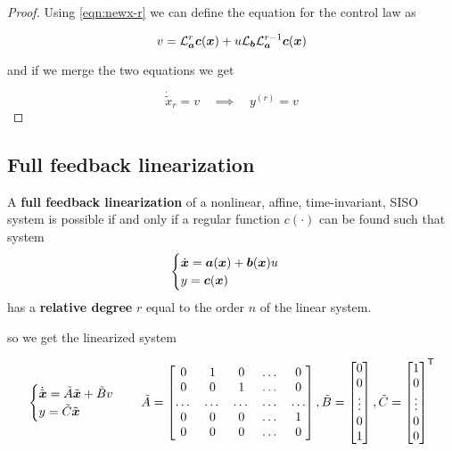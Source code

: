 \begin{proof}
    Using \cref{eqn:newx-r} we can define the equation for the control law as

    \[
        v = \mathcal{L}_{\boldsymbol{a}}^{r} \boldsymbol{c}(\boldsymbol{x}) + u \mathcal{L}_{\boldsymbol{b}} \mathcal{L}_{\boldsymbol{a}}^{r-1} \boldsymbol{c}(\boldsymbol{x})
    \]

    and if we merge the two equations we get

    \[
        \dot{\tilde x}_r = v \quad \implies \quad y^{(r)} = v
    \]
\end{proof}

\subsection{Full feedback linearization}

\begin{theorem}\label{thm:full-feedback-linearization}
A \textbf{full feedback linearization} of a nonlinear, affine, time-invariant, SISO system is possible if and only if a regular function $c(\cdot)$ can be found such that system
\[
    \begin{cases}
        \dot{\boldsymbol{x}} = \boldsymbol{a}(\boldsymbol{x}) + \boldsymbol{b}(\boldsymbol{x}) u \\
        y = \boldsymbol{c}(\boldsymbol{x})
    \end{cases}
\]
has a \textbf{relative degree} $r$ equal to the order $n$ of the linear system.
\end{theorem}

so we get the linearized system

\[
    \begin{cases}
        \dot{\tilde{\boldsymbol{x}}} = \tilde A \tilde{\boldsymbol{x}} + \tilde B v \\
        y = \tilde C \tilde{\boldsymbol{x}}
    \end{cases} \quad
    \tilde A = \begin{bmatrix}
            0 & 1 & 0 & \dots & 0 \\
            0 & 0 & 1 & \dots & 0 \\
            \dots & \dots & \dots & \dots & \dots \\
            0 & 0 & 0 & \dots & 1 \\
            0 & 0 & 0 & \dots & 0 \\
    \end{bmatrix},
    \tilde B = \begin{bmatrix}
                   0 \\ 0 \\ \vdots \\ 0 \\ 1
    \end{bmatrix},
    \tilde C = \begin{bmatrix}
                   1 \\ 0 \\ \vdots \\ 0 \\ 0
    \end{bmatrix}^{\mathsf{T}}
\]

